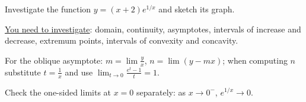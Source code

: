 
\begin{question}
Investigate the function $y=(x+2)e^{1/x}$ and sketch its graph.

\underline{You need to investigate}: domain, continuity, asymptotes, intervals of increase and decrease, extremum points, intervals of convexity and concavity.
\end{question}

\begin{hint}
For the oblique asymptote: $m=\lim\frac{y}{x}$, $n=\lim(y-mx)$; when computing $n$ substitute $t=\frac1x$ and use $\lim_{t\to0}\frac{e^t-1}{t}=1$.
\end{hint}

\begin{hint}
Check the one-sided limits at $x=0$ separately: as $x\to0^-$, $e^{1/x}\to0$.
\end{hint}

